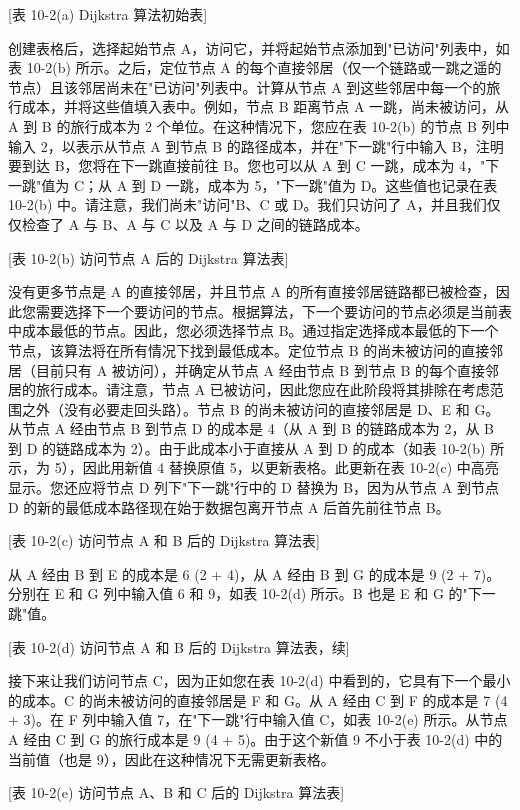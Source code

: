 \documentclass[oneside,UTF8]{ctexart}
\numberwithin{figure}{section} %
\begin{document}
[表 10-2(a) Dijkstra 算法初始表]

创建表格后，选择起始节点 A，访问它，并将起始节点添加到"已访问"列表中，如表 10-2(b) 所示。之后，定位节点 A 的每个直接邻居（仅一个链路或一跳之遥的节点）且该邻居尚未在"已访问"列表中。计算从节点 A 到这些邻居中每一个的旅行成本，并将这些值填入表中。例如，节点 B 距离节点 A 一跳，尚未被访问，从 A 到 B 的旅行成本为 2 个单位。在这种情况下，您应在表 10-2(b) 的节点 B 列中输入 2，以表示从节点 A 到节点 B 的路径成本，并在"下一跳"行中输入 B，注明要到达 B，您将在下一跳直接前往 B。您也可以从 A 到 C 一跳，成本为 4，"下一跳"值为 C；从 A 到 D 一跳，成本为 5，"下一跳"值为 D。这些值也记录在表 10-2(b) 中。请注意，我们尚未"访问"B、C 或 D。我们只访问了 A，并且我们仅仅检查了 A 与 B、A 与 C 以及 A 与 D 之间的链路成本。

[表 10-2(b) 访问节点 A 后的 Dijkstra 算法表]

没有更多节点是 A 的直接邻居，并且节点 A 的所有直接邻居链路都已被检查，因此您需要选择下一个要访问的节点。根据算法，下一个要访问的节点必须是当前表中成本最低的节点。因此，您必须选择节点 B。通过指定选择成本最低的下一个节点，该算法将在所有情况下找到最低成本。定位节点 B 的尚未被访问的直接邻居（目前只有 A 被访问），并确定从节点 A 经由节点 B 到节点 B 的每个直接邻居的旅行成本。请注意，节点 A 已被访问，因此您应在此阶段将其排除在考虑范围之外（没有必要走回头路）。节点 B 的尚未被访问的直接邻居是 D、E 和 G。从节点 A 经由节点 B 到节点 D 的成本是 4（从 A 到 B 的链路成本为 2，从 B 到 D 的链路成本为 2）。由于此成本小于直接从 A 到 D 的成本（如表 10-2(b) 所示，为 5），因此用新值 4 替换原值 5，以更新表格。此更新在表 10-2(c) 中高亮显示。您还应将节点 D 列下"下一跳"行中的 D 替换为 B，因为从节点 A 到节点 D 的新的最低成本路径现在始于数据包离开节点 A 后首先前往节点 B。

[表 10-2(c) 访问节点 A 和 B 后的 Dijkstra 算法表]

从 A 经由 B 到 E 的成本是 6 (2 + 4)，从 A 经由 B 到 G 的成本是 9 (2 + 7)。分别在 E 和 G 列中输入值 6 和 9，如表 10-2(d) 所示。B 也是 E 和 G 的"下一跳"值。

[表 10-2(d) 访问节点 A 和 B 后的 Dijkstra 算法表，续]

接下来让我们访问节点 C，因为正如您在表 10-2(d) 中看到的，它具有下一个最小的成本。C 的尚未被访问的直接邻居是 F 和 G。从 A 经由 C 到 F 的成本是 7 (4 + 3)。在 F 列中输入值 7，在"下一跳"行中输入值 C，如表 10-2(e) 所示。从节点 A 经由 C 到 G 的旅行成本是 9 (4 + 5)。由于这个新值 9 不小于表 10-2(d) 中的当前值（也是 9），因此在这种情况下无需更新表格。

[表 10-2(e) 访问节点 A、B 和 C 后的 Dijkstra 算法表]
\end{document}
